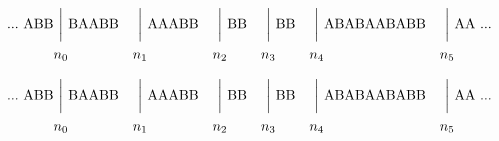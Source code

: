 \documentclass{scrartcl}
\newcommand\vertwithin[1]{%
	{\mathmakebox[\widthof{\ensuremath{{}#1{}}}][c]{{\biggm\vert}}}}%
\begin{document}
	
	\begin{align}
		... \  \text{ABB} & \vertwithin{n_0} \text{BAABB} & & \vertwithin{n_1} \text{AAABB}& &\vertwithin{n_2} \text{BB} & & \vertwithin{n_3} \text{BB} & & \vertwithin{n_4} \text{ABABAABABB} & & \vertwithin{n_5} \text{AA} \   ... \\
		& n_0 & & n_1 & & n_2 & & n_3 & & n_4 & & n_5
	\end{align}
	
	\begin{alignat}{6}
		... \  \text{ABB} & \vertwithin{n_0} \text{BAABB} & & \vertwithin{n_1} \text{AAABB}& & \vertwithin{n_2} \text{BB} & & \vertwithin{n_3} \text{BB} & & \vertwithin{n_4} \text{ABABAABABB} & & \vertwithin{n_5} \text{AA} \  ... \\
		& n_0 & & n_1 & & n_2 & & n_3 & & n_4 & & n_5
	\end{alignat}
	
\end{document}
